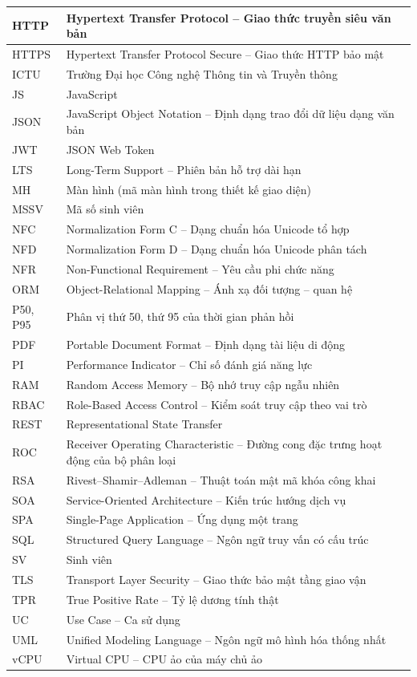\documentclass[../main.tex]{subfiles}
\begin{document}
{\begin{longtable}{|p{3cm}|p{11cm}|}
\hline
HTTP & Hypertext Transfer Protocol -- Giao thức truyền siêu văn bản \\
\hline
HTTPS & Hypertext Transfer Protocol Secure -- Giao thức HTTP bảo mật \\
\hline
ICTU & Trường Đại học Công nghệ Thông tin và Truyền thông \\
\hline
JS & JavaScript \\
\hline
JSON & JavaScript Object Notation -- Định dạng trao đổi dữ liệu dạng văn bản \\
\hline
JWT & JSON Web Token \\
\hline
LTS & Long-Term Support -- Phiên bản hỗ trợ dài hạn \\
\hline
MH & Màn hình (mã màn hình trong thiết kế giao diện) \\
\hline
MSSV & Mã số sinh viên \\
\hline
NFC & Normalization Form C -- Dạng chuẩn hóa Unicode tổ hợp \\
\hline
NFD & Normalization Form D -- Dạng chuẩn hóa Unicode phân tách \\
\hline
NFR & Non-Functional Requirement -- Yêu cầu phi chức năng \\
\hline
ORM & Object-Relational Mapping -- Ánh xạ đối tượng -- quan hệ \\
\hline
P50, P95 & Phân vị thứ 50, thứ 95 của thời gian phản hồi \\
\hline
PDF & Portable Document Format -- Định dạng tài liệu di động \\
\hline
PI & Performance Indicator -- Chỉ số đánh giá năng lực \\
\hline
RAM & Random Access Memory -- Bộ nhớ truy cập ngẫu nhiên \\
\hline
RBAC & Role-Based Access Control -- Kiểm soát truy cập theo vai trò \\
\hline
REST & Representational State Transfer \\
\hline
ROC & Receiver Operating Characteristic -- Đường cong đặc trưng hoạt động của bộ phân loại \\
\hline
RSA & Rivest--Shamir--Adleman -- Thuật toán mật mã khóa công khai \\
\hline
SOA & Service-Oriented Architecture -- Kiến trúc hướng dịch vụ \\
\hline
SPA & Single-Page Application -- Ứng dụng một trang \\
\hline
SQL & Structured Query Language -- Ngôn ngữ truy vấn có cấu trúc \\
\hline
SV & Sinh viên \\
\hline
TLS & Transport Layer Security -- Giao thức bảo mật tầng giao vận \\
\hline
TPR & True Positive Rate -- Tỷ lệ dương tính thật \\
\hline
UC & Use Case -- Ca sử dụng \\
\hline
UML & Unified Modeling Language -- Ngôn ngữ mô hình hóa thống nhất \\
\hline
vCPU & Virtual CPU -- CPU ảo của máy chủ ảo \\
\hline
\end{longtable}
}
\end{document}
